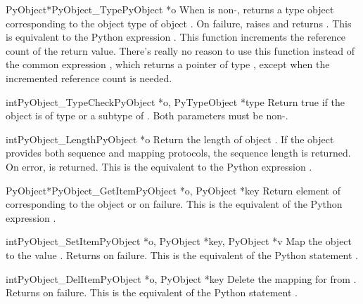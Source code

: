 \begin{cfuncdesc}{PyObject*}{PyObject_Type}{PyObject *o}
  When  is non-\NULL, returns a type object corresponding to
  the object type of object . On failure, raises
   and returns \NULL.  This is equivalent to
  the Python expression .
  This function increments the reference count of the return value.
  There's really no reason to use this function instead of the
  common expression , which returns a pointer
  of type , except when the incremented reference
  count is needed.
\end{cfuncdesc}

\begin{cfuncdesc}{int}{PyObject_TypeCheck}{PyObject *o, PyTypeObject *type}
  Return true if the object  is of type  or a subtype
  of .  Both parameters must be non-\NULL.
\end{cfuncdesc}

\begin{cfuncdesc}{int}{PyObject_Length}{PyObject *o}
  Return the length of object .  If the object  provides
  both sequence and mapping protocols, the sequence length is
  returned.  On error,  is returned.  This is the equivalent
  to the Python expression .
\end{cfuncdesc}


\begin{cfuncdesc}{PyObject*}{PyObject_GetItem}{PyObject *o, PyObject *key}
  Return element of  corresponding to the object  or
  \NULL{} on failure.  This is the equivalent of the Python expression
  .
\end{cfuncdesc}


\begin{cfuncdesc}{int}{PyObject_SetItem}{PyObject *o,
                                         PyObject *key, PyObject *v}
  Map the object  to the value .  Returns  on
  failure.  This is the equivalent of the Python statement
  .
\end{cfuncdesc}


\begin{cfuncdesc}{int}{PyObject_DelItem}{PyObject *o, PyObject *key}
  Delete the mapping for  from .  Returns  on
  failure. This is the equivalent of the Python statement .
\end{cfuncdesc}

